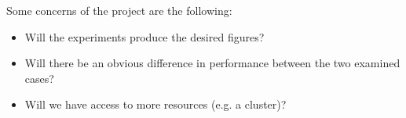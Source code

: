 \documentclass[a4paper,11pt]{article}
\begin{document}
Some concerns of the project are the following:
\begin{itemize}
    \item Will the experiments produce the desired figures?
    \item Will there be an obvious difference in performance between the two examined cases?
    \item Will we have access to more resources (e.g. a cluster)?
\end{itemize}

\end{document}
